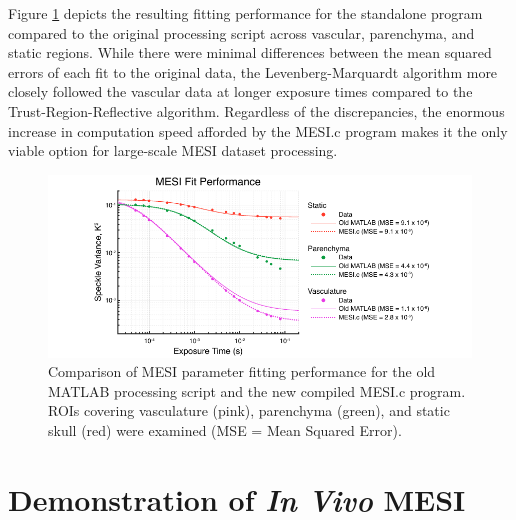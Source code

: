 Figure \ref{fig:mesifit} depicts the resulting fitting performance for the standalone program compared to the original processing script across vascular, parenchyma, and static regions. While there were minimal differences between the mean squared errors of each fit to the original data, the Levenberg-Marquardt algorithm more closely followed the vascular data at longer exposure times compared to the Trust-Region-Reflective algorithm. Regardless of the discrepancies, the enormous increase in computation speed afforded by the MESI.c program makes it the only viable option for large-scale MESI dataset processing.

\begin{figure}
    \includegraphics{figures/chapter_4/mesifit.pdf}
    \caption[Comparison of MESI parameter fitting performance for the old MATLAB processing script and the new compiled MESI.c program.]{
        \label{fig:mesifit}
        Comparison of MESI parameter fitting performance for the old MATLAB processing script and the new compiled MESI.c program. ROIs covering vasculature (pink), parenchyma (green), and static skull (red) were examined (MSE = Mean Squared Error).
    }
\end{figure}



\section{Demonstration of \textit{In Vivo} MESI}

\blindtext



